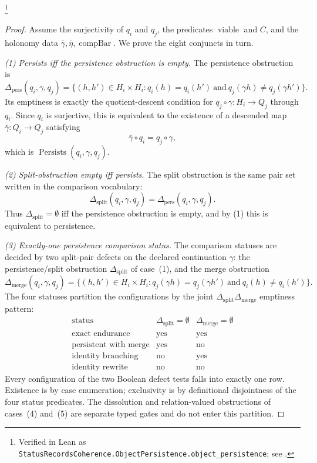 \documentclass[11pt]{article}
\theoremstyle{definition}
\begin{document}
\footnote{\raggedright Verified in Lean as
\texttt{StatusRecordsCoherence.ObjectPersistence.\allowbreak{}object\_persistence};
see .}
\begin{proof}
Assume the surjectivity of \(q_i\) and \(q_j\), the predicates
\(\operatorname{viable}\) and \(C\), and the holonomy data
\(\bar\gamma,\bar\eta,\operatorname{compBar}\).  We prove the eight
conjuncts in turn.

\emph{(1) Persists iff the persistence obstruction is empty.}
The persistence obstruction is
\[
  \Delta_{\mathrm{pers}}(q_i,\gamma,q_j)
  =
  \{(h,h')\in H_i\times H_i:
      q_i(h)=q_i(h')\ \text{and}\
      q_j(\gamma h)\ne q_j(\gamma h')\}.
\]
Its emptiness is exactly the quotient-descent condition for
\(q_j\circ\gamma:H_i\to Q_j\) through \(q_i\).  Since \(q_i\) is
surjective, this is equivalent to the existence of a descended map
\(\bar\gamma:Q_i\to Q_j\) satisfying
\[
  \bar\gamma\circ q_i=q_j\circ\gamma,
\]
which is \(\operatorname{Persists}(q_i,\gamma,q_j)\).

\emph{(2) Split-obstruction empty iff persists.}
The split obstruction is the same pair set written in the comparison
vocabulary:
\[
  \Delta_{\mathrm{split}}(q_i,\gamma,q_j)
  =
  \Delta_{\mathrm{pers}}(q_i,\gamma,q_j).
\]
Thus \(\Delta_{\mathrm{split}}=\emptyset\) iff the persistence
obstruction is empty, and by (1) this is equivalent to persistence.

\emph{(3) Exactly-one persistence comparison status.}
The comparison statuses are decided by two split-pair defects on the
declared continuation \(\gamma\): the persistence/split obstruction
\(\Delta_{\mathrm{split}}\) of case~(1), and the merge obstruction
\[
  \Delta_{\mathrm{merge}}(q_i,\gamma,q_j)
  =
  \{(h,h')\in H_i\times H_i:
      q_j(\gamma h)=q_j(\gamma h')\ \text{and}\ q_i(h)\ne q_i(h')\}.
\]
The four statuses partition the configurations by the joint
\(\Delta_{\mathrm{split}}\)\textendash{}\(\Delta_{\mathrm{merge}}\)
emptiness pattern:
\[
\begin{array}{c|c|c}
\text{status} & \Delta_{\mathrm{split}}=\emptyset
  & \Delta_{\mathrm{merge}}=\emptyset\\
\hline
\text{exact endurance} & \text{yes} & \text{yes}\\
\text{persistent with merge} & \text{yes} & \text{no}\\
\text{identity branching} & \text{no} & \text{yes}\\
\text{identity rewrite} & \text{no} & \text{no}
\end{array}
\]
Every configuration of the two Boolean defect tests falls into
exactly one row.  Existence is by case enumeration; exclusivity is by
definitional disjointness of the four status predicates.  The
dissolution and relation-valued obstructions of cases~(4) and~(5) are
separate typed gates and do not enter this partition.


\end{proof}
\end{document}
